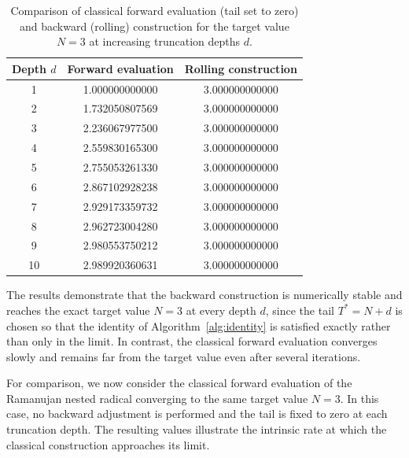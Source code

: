 \documentclass[11pt,a4paper]{amsart}
\theoremstyle{plain}
\theoremstyle{definition}
\theoremstyle{remark}
\begin{document}
\begin{table}[H]
\centering
\begin{tabular}{c|c|c}
Depth $d$ & Forward evaluation & Rolling construction \\
\hline
1 & 1.000000000000 & 3.000000000000 \\
2 & 1.732050807569 & 3.000000000000 \\
3 & 2.236067977500 & 3.000000000000 \\
4 & 2.559830165300 & 3.000000000000 \\
5 & 2.755053261330 & 3.000000000000 \\
6 & 2.867102928238 & 3.000000000000 \\
7 & 2.929173359732 & 3.000000000000 \\
8 & 2.962723004280 & 3.000000000000 \\
9 & 2.980553750212 & 3.000000000000 \\
10 & 2.989920360631 & 3.000000000000
\end{tabular}
\caption{Comparison of classical forward evaluation (tail set to zero) and backward (rolling) construction for the target value $N=3$ at increasing truncation depths $d$.}
\label{tab:rolling-vs-forward}
\end{table}

The results demonstrate that the backward construction is numerically stable and reaches the exact target value $N=3$ at every depth $d$, since the tail $T^\ast = N+d$ is chosen so that the identity of Algorithm~\ref{alg:identity} is satisfied exactly rather than only in the limit. In contrast, the classical forward evaluation converges slowly and remains far from the target value even after several iterations.

For comparison, we now consider the classical forward evaluation of the Ramanujan nested radical converging to the same target value $N=3$. In this case, no backward adjustment is performed and the tail is fixed to zero at each truncation depth. The resulting values illustrate the intrinsic rate at which the classical construction approaches its limit.
\end{document}

